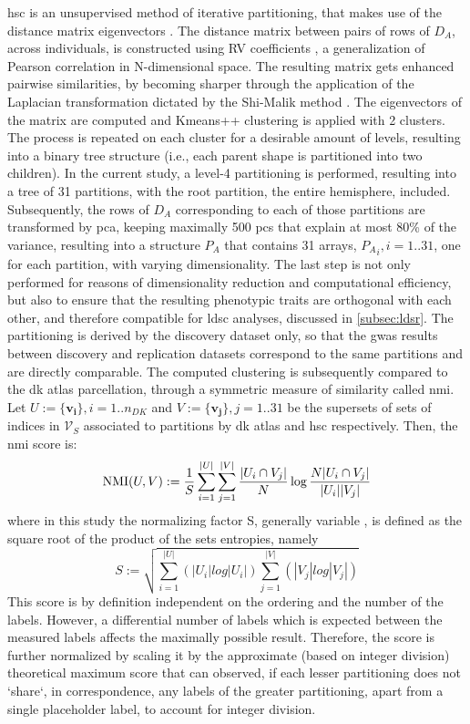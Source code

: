 \Ac{hsc} is an unsupervised method of iterative partitioning, that makes use of the distance matrix eigenvectors \cite{Ng2002}. The distance matrix between pairs of rows of $D_A$, across individuals, is constructed using RV coefficients \cite{Robert1976}, a generalization of Pearson correlation in N-dimensional space. The resulting matrix gets enhanced pairwise similarities, by becoming sharper through the application of the Laplacian transformation dictated by the Shi-Malik method \cite{Shi2000}. The eigenvectors of the matrix are computed and Kmeans++ clustering \cite{Arthur2007} is applied with 2 clusters. The process is repeated on each cluster for a desirable amount of levels, resulting into a binary tree structure (i.e., each parent shape is partitioned into two children). In the current study, a level-4 partitioning is performed, resulting into a tree of 31 partitions, with the root partition, the entire hemisphere, included. Subsequently, the rows of $D_A$ corresponding to each of those partitions are transformed by \ac{pca}, keeping maximally 500 \acp{pc} that explain at most 80\% of the variance, resulting into a structure $P_A$ that contains 31 arrays, ${P_A}_i,i=1..31$, one for each partition, with varying dimensionality. The last step is not only performed for reasons of dimensionality reduction and computational efficiency, but also to ensure that the resulting phenotypic traits are orthogonal with each other, and therefore compatible for \ac{ldsc} analyses, discussed in \autoref{subsec:ldsr}. The partitioning is derived by the discovery dataset only, so that the \ac{gwas} results between discovery and replication datasets correspond to the same partitions and are directly comparable. The computed clustering is subsequently compared to the \ac{dk} atlas parcellation, through a symmetric measure of similarity called \ac{nmi}. Let $U:=\{\mathbf{v_i}\},i=1..n_{DK}$ and $V:=\{\mathbf{{v_j}}\},j=1..31$ be the supersets of sets of indices in $\mathcal{V}_S$ associated to partitions by \ac{dk} atlas and  \ac{hsc} respectively. Then, the \ac{nmi} score is:
$$
\operatorname*{NMI}(U,V):=\frac{1}{S}\sum_{i=1}^{|U|} \sum_{j=1}^{|V|} \frac{|U_i\cap V_j|}{N}
\log\frac{N|U_i \cap V_j|}{|U_i||V_j|}
$$
where in this study the normalizing factor S, generally variable \cite{Strehl2003}, is defined as the square root of the product of the sets entropies, namely  
$$
S:=\sqrt{\sum_{i=1}^{|U|}\left(|U_i|log|U_i|\right)\sum_{j=1}^{|V|}\left(|V_j|log|V_j|\right)}
$$
This score is by definition independent on the ordering and the number of the labels. However, a differential number of labels which is expected between the measured labels affects the maximally possible result. Therefore, the score is further normalized by scaling it by the approximate (based on integer division) theoretical maximum score that can observed, if each lesser partitioning does not `share`, in correspondence, any labels of the greater partitioning, apart from a single placeholder label, to account for integer division.

